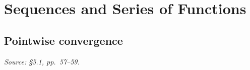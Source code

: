 
\section{Sequences and Series of Functions}

\subsection{Pointwise convergence}
\textit{Source: \S5.1, pp.~57--59.}

